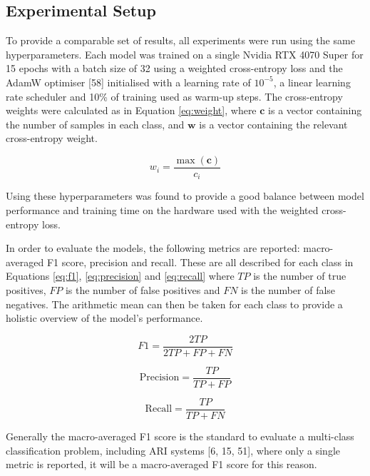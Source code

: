 \documentclass[twocolumn,twoside]{article}
\begin{document}
\subsection{Experimental Setup}\label{sec:exp-setup}

To provide a comparable set of results, all experiments were run using
the same hyperparameters. Each model was trained on a single Nvidia RTX
4070 Super for 15 epochs with a batch size of 32 using a weighted
cross-entropy loss and the AdamW optimiser {[}58{]} initialised with a
learning rate of \(10^{-5}\), a linear learning rate scheduler and 10\%
of training used as warm-up steps. The cross-entropy weights were
calculated as in Equation \ref{eq:weight}, where \(\mathbf{c}\) is a
vector containing the number of samples in each class, and
\(\mathbf{w}\) is a vector containing the relevant cross-entropy weight.

\begin{equation} w_i = \frac{\max(\mathbf{c})}{c_i} \label{eq:weight}\end{equation}

Using these hyperparameters was found to provide a good balance between
model performance and training time on the hardware used with the
weighted cross-entropy loss.

In order to evaluate the models, the following metrics are reported:
macro-averaged F1 score, precision and recall. These are all described
for each class in Equations \ref{eq:f1}, \ref{eq:precision} and
\ref{eq:recall} where \(TP\) is the number of true positives, \(FP\) is
the number of false positives and \(FN\) is the number of false
negatives. The arithmetic mean can then be taken for each class to
provide a holistic overview of the model's performance.

\begin{equation} F1 = \frac{2TP}{2TP + FP + FN} \label{eq:f1}\end{equation}

\begin{equation} \text{Precision} = \frac{TP}{TP + FP} \label{eq:precision}\end{equation}

\begin{equation} \text{Recall} = \frac{TP}{TP + FN} \label{eq:recall}\end{equation}

Generally the macro-averaged F1 score is the standard to evaluate a
multi-class classification problem, including ARI systems {[}6,
15, 51{]}, where only a single metric is reported, it will be a
macro-averaged F1 score for this reason.
\end{document}
